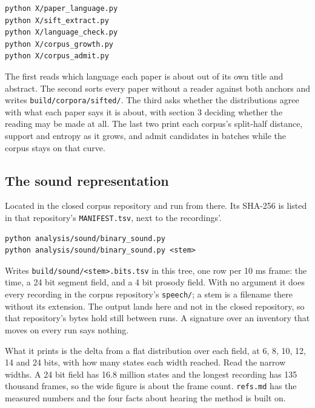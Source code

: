 \begin{lstlisting}[breaklines=true,breakatwhitespace=false,basicstyle=\ttfamily\small]
python X/paper_language.py
python X/sift_extract.py
python X/language_check.py
python X/corpus_growth.py
python X/corpus_admit.py
\end{lstlisting}

The first reads which language each paper is about out of its own title and abstract. The second sorts every paper without a reader against both anchors and writes \texttt{build/\allowbreak{}corpora/\allowbreak{}sifted/\allowbreak{}}. The third asks whether the distributions agree with what each paper says it is about, with section 3 deciding whether the reading may be made at all. The last two print each corpus's split-half distance, support and entropy as it grows, and admit candidates in batches while the corpus stays on that curve.

\subsection{The sound representation}

Located in the closed corpus repository and run from there. Its SHA-256 is listed in that repository's \texttt{MANIFEST.\allowbreak{}tsv}, next to the recordings'.

\begin{lstlisting}[breaklines=true,breakatwhitespace=false,basicstyle=\ttfamily\small]
python analysis/sound/binary_sound.py
python analysis/sound/binary_sound.py <stem>
\end{lstlisting}

Writes \texttt{build/\allowbreak{}sound/\allowbreak{}<stem>.\allowbreak{}bits.\allowbreak{}tsv} in this tree, one row per 10 ms frame: the time, a 24 bit segment field, and a 4 bit prosody field. With no argument it does every recording in the corpus repository's \texttt{speech/\allowbreak{}}; a stem is a filename there without its extension. The output lands here and not in the closed repository, so that repository's bytes hold still between runs. A signature over an inventory that moves on every run says nothing.

What it prints is the delta from a flat distribution over each field, at 6, 8, 10, 12, 14 and 24 bits, with how many states each width reached. Read the narrow widths. A 24 bit field has 16.8 million states and the longest recording has 135 thousand frames, so the wide figure is about the frame count. \texttt{refs.\allowbreak{}md} has the measured numbers and the four facts about hearing the method is built on.

